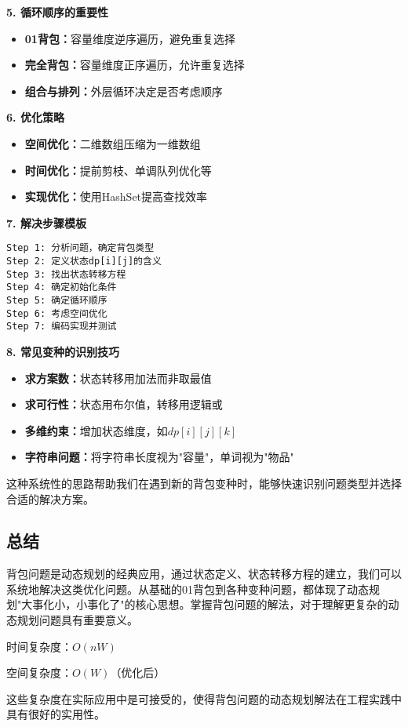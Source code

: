\textbf{5. 循环顺序的重要性}
\begin{itemize}
\item \textbf{01背包：}容量维度逆序遍历，避免重复选择
\item \textbf{完全背包：}容量维度正序遍历，允许重复选择
\item \textbf{组合与排列：}外层循环决定是否考虑顺序
\end{itemize}

\textbf{6. 优化策略}
\begin{itemize}
\item \textbf{空间优化：}二维数组压缩为一维数组
\item \textbf{时间优化：}提前剪枝、单调队列优化等
\item \textbf{实现优化：}使用HashSet提高查找效率
\end{itemize}

\textbf{7. 解决步骤模板}
\begin{verbatim}
Step 1: 分析问题，确定背包类型
Step 2: 定义状态dp[i][j]的含义
Step 3: 找出状态转移方程
Step 4: 确定初始化条件
Step 5: 确定循环顺序
Step 6: 考虑空间优化
Step 7: 编码实现并测试
\end{verbatim}

\textbf{8. 常见变种的识别技巧}
\begin{itemize}
\item \textbf{求方案数：}状态转移用加法而非取最值
\item \textbf{求可行性：}状态用布尔值，转移用逻辑或
\item \textbf{多维约束：}增加状态维度，如$dp[i][j][k]$
\item \textbf{字符串问题：}将字符串长度视为"容量"，单词视为"物品"
\end{itemize}

这种系统性的思路帮助我们在遇到新的背包变种时，能够快速识别问题类型并选择合适的解决方案。

\subsection{总结}
背包问题是动态规划的经典应用，通过状态定义、状态转移方程的建立，我们可以系统地解决这类优化问题。从基础的01背包到各种变种问题，都体现了动态规划"大事化小，小事化了"的核心思想。掌握背包问题的解法，对于理解更复杂的动态规划问题具有重要意义。

时间复杂度：$O(nW)$

空间复杂度：$O(W)$（优化后）

这些复杂度在实际应用中是可接受的，使得背包问题的动态规划解法在工程实践中具有很好的实用性。



